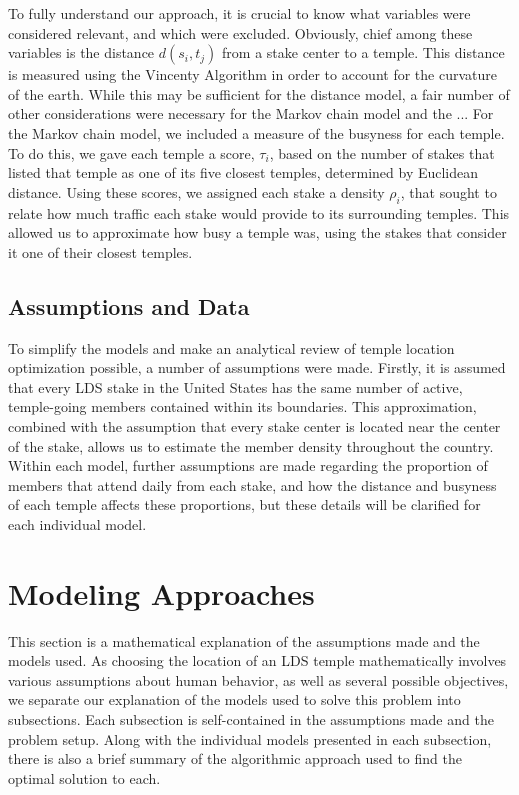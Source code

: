 \documentclass[twoside,twocolumn]{article}
\begin{document}

\noindent To fully understand our approach, it is crucial to know what variables were considered relevant, and which were excluded.
Obviously, chief among these variables is the distance $d(s_{i},t_{j})$ from a stake center to a temple.
This distance is measured using the Vincenty Algorithm in order to account for the curvature of the earth.
While this may be sufficient for the distance model, a fair number of other considerations were necessary for the Markov chain model and the ...
For the Markov chain model, we included a measure of the busyness for each temple.
To do this, we gave each temple a score, $\tau_{i}$, based on the number of stakes that listed that temple as one of its five closest temples, determined by Euclidean distance.
Using these scores, we assigned each stake a density $\rho_{i}$, that sought to relate how much traffic each stake would provide to its surrounding temples.
This allowed us to approximate how busy a temple was, using the stakes that consider it one of their closest temples.

\subsection{Assumptions and Data}
To simplify the models and make an analytical review of temple location optimization possible, a number of assumptions were made.
Firstly, it is assumed that every LDS stake in the United States has the same number of active, temple-going members contained within its boundaries.
This approximation, combined with the assumption that every stake center is located near the center of the stake, allows us to estimate the member density throughout the country.
Within each model, further assumptions are made regarding the proportion of members that attend daily from each stake, and how the distance and busyness of each temple affects these proportions, but these details will be clarified for each individual model.

\section{Modeling Approaches}
\label{sec:models}
This section is a mathematical explanation of the assumptions made and the models used.
As choosing the location of an LDS temple mathematically involves various assumptions about human behavior, as well as several possible objectives, we separate our explanation of the models used to solve this problem into subsections. %
Each subsection is self-contained in the assumptions made and the problem setup.
Along with the individual models presented in each subsection, there is also a brief summary of the algorithmic approach used to find the optimal solution to each.
\end{document}
